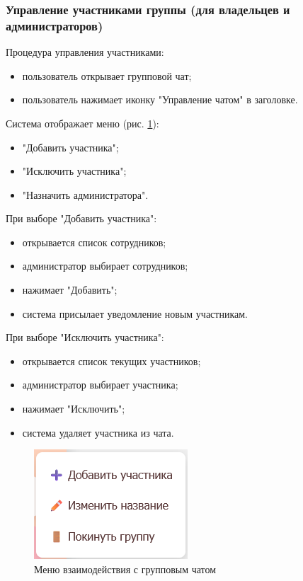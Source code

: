 \subsubsection{Управление участниками группы (для владельцев и администраторов)}  
Процедура управления участниками:  
\begin{itemize}  
	\item пользователь открывает групповой чат;  
	\item пользователь нажимает иконку "Управление чатом" в заголовке.  
\end{itemize}

Система отображает меню (рис. \ref{fig:menu-group}):

\begin{itemize}  
	\item "Добавить участника";  
	\item "Исключить участника";  
	\item "Назначить администратора".  
\end{itemize}

При выборе "Добавить участника":  

\begin{itemize}
	\item открывается список сотрудников;  
	\item администратор выбирает сотрудников;  
	\item нажимает "Добавить";  
	\item система присылает уведомление новым участникам.
\end{itemize}

При выборе "Исключить участника":  

\begin{itemize}
	\item открывается список текущих участников;  
	\item администратор выбирает участника;  
	\item нажимает "Исключить";  
	\item система удаляет участника из чата.  
\end{itemize}

\begin{figure}[!h]
	\centering
	\includegraphics[width=0.8\linewidth]{"images/Меню взаимодействия с групповым чатом "}
	\caption{Меню взаимодействия с групповым чатом}
	\label{fig:menu-group}
\end{figure}

